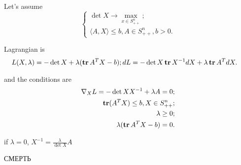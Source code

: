 \begin{eexl}
    Let's assume 
    \begin{equation*}
        \begin{cases}
            \det X \to \max_{x \in S_{++}^n}; \\ 
            \langle A, X \rangle \leq b, A \in S_{++}^{n}, b > 0.
        \end{cases}
    \end{equation*}

    Lagrangian is
    \begin{equation*}
        \begin{aligned}
            L(X, \lambda) &= -\det X + \lambda (\operatorname{\textbf{tr}} A^T X - b); 
            dL = -\det X \operatorname{\textbf{tr}} X^{-1} dX + \lambda \operatorname{\textbf{tr}} A^T dX.
        \end{aligned}
    \end{equation*}

    and the conditions are
    \begin{equation*}
        \begin{aligned}
            \nabla_X L = -\det X X^{-1} + \lambda A = 0; \\ 
            \operatorname{\textbf{tr}}( A^T X ) \leq b, X \in S_{++}^n; \\  
            \lambda \geq 0; \\ 
            \lambda (\operatorname{\textbf{tr}} A^T X - b) = 0.
        \end{aligned}
    \end{equation*}

    if $\lambda = 0$, $X^{-1} = \frac{\lambda}{\det X} A $ 

    \begin{center}
        \Huge{СМЕРТЬ}
    \end{center}
\end{eexl}

